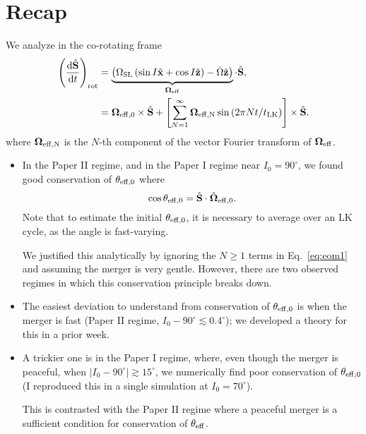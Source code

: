 \documentclass[11pt,
        usenames, %
        dvipsnames %
    ]{article}
\newcommand*{\rd}[2]{\frac{\mathrm{d}#1}{\mathrm{d}#2}}
\newcommand*{\bm}[1]{\boldsymbol{\mathbf{#1}}}
\newcommand*{\uv}[1]{\hat{\bm{#1}}}
\newcommand*{\abs}[1]{\left|#1\right|}
\newcommand*{\p}[1]{\left(#1\right)}
\newcommand*{\s}[1]{\left[#1\right]}
\begin{document}
\def\Snospace~{\S{}} %
\renewcommand*{\sectionautorefname}{\Snospace}
\renewcommand*{\appendixautorefname}{\Snospace}
\renewcommand*{\figureautorefname}{Fig.}
\renewcommand*{\equationautorefname}{Eq.}
\renewcommand*{\tableautorefname}{Tab.}

\section{Recap}

We analyze in the co-rotating frame
\begin{align}
    \p{\rd{\uv{S}}{t}}_{\rm rot}
        &= \underbrace{\p{\Omega_{\rm SL}\p{\sin I \uv{x} + \cos I \uv{z}}
                - \dot{\Omega} \uv{z}}}
            _{\bm{\Omega}_{\rm eff}} \cdot \uv{S},\label{eq:eom0}\\
        &= \bm{\Omega}_{\rm eff, 0} \times \uv{S}
        + \s{
            \sum\limits_{N = 1}^\infty \bm{\Omega}_{\rm eff, N}
            \sin\p{2\pi N t / t_{\rm LK}}} \times \uv{S}.\label{eq:eom1}
\end{align}
where $\bm{\Omega}_{\rm eff, N}$ is the $N$-th component of the vector Fourier
transform of $\bm{\Omega}_{\rm eff}$.

\begin{itemize}
    \item In the Paper II regime, and in the Paper I regime near $I_0 =
        90^\circ$, we found good conservation of $\theta_{\rm eff, 0}$ where
        \begin{equation}
            \cos \theta_{\rm eff, 0} = \uv{S} \cdot \uv{\Omega}_{\rm eff, 0}.
        \end{equation}
        Note that to estimate the initial $\theta_{\rm eff, 0}$, it is necessary
        to average over an LK cycle, as the angle is fast-varying.

        We justified this analytically by ignoring the $N \geq 1$ terms in
        Eq.~\eqref{eq:eom1} and assuming the merger is very gentle. However,
        there are two observed regimes in which this conservation principle
        breaks down.

    \item The easiest deviation to understand from conservation of $\theta_{\rm
        eff, 0}$ is when the merger is fast (Paper II regime, $I_0 - 90^\circ
        \lesssim 0.4^\circ$); we developed a theory for this in a prior week.

    \item A trickier one is in the Paper I regime, where, even though the merger
        is peaceful, when $\abs{I_0 - 90^\circ} \gtrsim 15^\circ$, we
        numerically find poor conservation of $\theta_{\rm eff, 0}$ (I
        reproduced this in a single simulation at $I_0 = 70^\circ$).

        This is contrasted with the Paper II regime where a peaceful merger is a
        sufficient condition for conservation of $\theta_{\rm eff}$.
\end{itemize}
\end{document}
